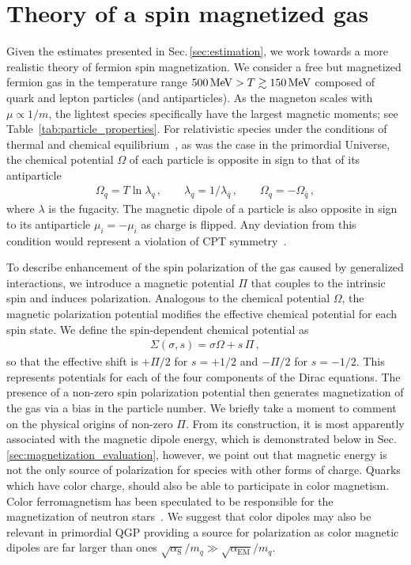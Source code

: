 \documentclass[epjST]{svjour}
\newcommand*{\MeV}{\text{\,MeV}}
\newcommand{\rsec}[1]{Sec.\,{\ref{#1}}}
\begin{document}
\section{Theory of a spin magnetized gas\label{sec:magnetization}}
{\color{blue}Given the estimates presented in \rsec{sec:estimation}, we work towards a more realistic theory of fermion spin magnetization.} We consider a free but magnetized fermion gas in the temperature range \(500\MeV>T\gtrsim150\MeV\) composed of quark and lepton particles (and antiparticles). {\color{blue}As the magneton scales with \(\mu \propto 1/m\), the lightest species specifically have the largest magnetic moments; see Table~\ref{tab:particle_properties}.} For relativistic species under the conditions of thermal and chemical equilibrium~\cite{Elze:1980er}, as was the case in the primordial Universe, the chemical potential \(\Omega\) of each particle is opposite in sign to that of its antiparticle
\begin{align}
\label{eq:equilibirum_conditions}
\Omega_{q}=T\ln\lambda_{q}\,,\qquad
\lambda_{q}=1/\lambda_{\bar{q}}\,,\qquad
\Omega_{q}=-\Omega_{\bar{q}}\,,
\end{align}
where \(\lambda\) is the fugacity. The magnetic dipole of a particle is also opposite in sign to its antiparticle $\mu_{i}=-\mu_{\bar{i}}$ as charge is flipped. Any deviation from this condition would represent a violation of CPT {\color{blue}symmetry}~\cite{Colladay:1996iz,Bluhm:1997ci,BASE:2016yuo}.

{\color{blue}To describe enhancement of the spin polarization of the gas caused by generalized interactions, we introduce a magnetic potential \(\Pi\) that couples to the intrinsic spin and induces polarization. Analogous to the chemical potential \(\Omega\), the magnetic polarization potential modifies the effective chemical potential for each spin state. We define the spin-dependent chemical potential as
\begin{align}
\Sigma(\sigma,s) = \sigma\Omega + s\,\Pi\,,
\end{align}
so that the effective shift is \(+\Pi/2\) for \(s=+1/2\) and \(-\Pi/2\) for \(s=-1/2\). This represents potentials for each of the four components of the Dirac equations. The presence of a non-zero spin polarization potential then generates magnetization of the gas via a bias in the particle number. We briefly take a moment to comment on the physical origins of non-zero \(\Pi\). From its construction, it is most apparently associated with the magnetic dipole energy, which is demonstrated below in \rsec{sec:magnetization_evaluation}, however, we point out that magnetic energy is not the only source of polarization for species with other forms of charge. Quarks which have color charge, should also be able to participate in color magnetism. Color ferromagnetism has been speculated to be responsible for the magnetization of neutron stars~\cite{Iwazaki:2005nr,Miransky:2015ava}. We suggest that color dipoles may also be relevant in primordial QGP providing a source for polarization as color magnetic dipoles are far larger than ones \(\sqrt{\alpha_\mathrm{S}}/m_{q}\gg\sqrt{\alpha_\mathrm{EM}}/m_{q}\).}
\end{document}
